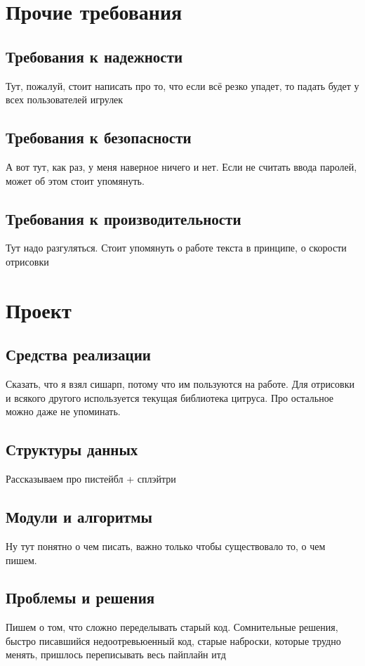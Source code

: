 \documentclass{fefu}
\begin{document}
	\section{Прочие требования}
	\subsection{Требования к надежности}
	\par Тут, пожалуй, стоит написать про то, что если всё резко упадет, то падать будет у всех пользователей игрулек
	\subsection{Требования к безопасности}
	\par А вот тут, как раз, у меня наверное ничего и нет. Если не считать ввода паролей, может об этом стоит упомянуть.
	\subsection{Требования к производительности}
	\par Тут надо разгуляться. Стоит упомянуть о работе текста в принципе, о скорости отрисовки
	
	\section{Проект}
	\subsection{Средства реализации}
	\par Сказать, что я взял сишарп, потому что им пользуются на работе. Для отрисовки и всякого другого используется текущая библиотека цитруса. Про остальное можно даже не упоминать.
	\subsection{Структуры данных}
	\par Рассказываем про пистейбл + сплэйтри
	\subsection{Модули и алгоритмы}
	\par Ну тут понятно о чем писать, важно только чтобы существовало то, о чем пишем.
	\subsection{Проблемы и решения}
	\par Пишем о том, что сложно переделывать старый код. Сомнительные решения, быстро писавшийся недоотревьюенный код, старые наброски, которые трудно менять, пришлось переписывать весь пайплайн итд
\end{document}
